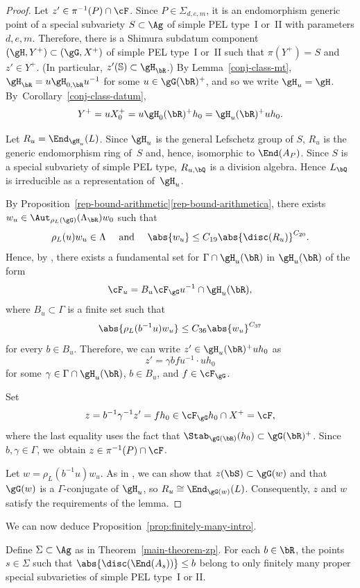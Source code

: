 \begin{proof}
Let $z'\in \pi^{-1}(P)\cap\cF$.
Since $P\in\Sigma_{d,e,m}$, it is an endomorphism generic point of a special subvariety $S \subset \Ag$ of simple PEL type~I or~II with parameters $d,e,m$.
Therefore, there is a Shimura subdatum component $(\gH, Y^+) \subset (\gG, X^+)$ of simple PEL type~I or~II such that $\pi(Y^+) = S$ and $z' \in Y^+$. (In particular, $z'(\mathbb{S})\subset\gH_{\bR}$.) By Lemma~\ref{conj-class-mt}, $\gH_{\bR} = u\gH_{0,\bR}u^{-1}$ for some $u\in\gG(\bR)^+$, and so we write $\gH_u=\gH$.
By~Corol\-lary~\ref{conj-class-datum},
\[Y^+=uX^+_0=u\gH_0(\bR)^+h_0=\gH_u(\bR)^+uh_0.
\]

Let $R_u = \End_{\gH_u}(L)$.
Since $\gH_u$ is the general Lefschetz group of $S$, $R_u$ is the generic endomorphism ring of~$S$ and, hence, isomorphic to $\End(A_P)$. Since $S$ is a special subvariety of simple PEL type, $R_{u,\bQ}$ is a division algebra.
Hence $L_\bQ$ is irreducible as a representation of~$\gH_u$.

By Proposition~\ref{rep-bound-arithmetic}\eqref{rep-bound-arithmetica}, there exists $w_u \in \Aut_{\rho_L(\gG)}(\Lambda_\bR) w_0$ such that
\[
\rho_L(u) w_u \in \Lambda \quad \text{ and } \quad \abs{w_u} \leq C_{19} \abs{\disc(R_u)}^{C_{20}}.
\]
Hence, by \cite[Th.\,1.2]{QRTUI}, there exists a fundamental set for $\Gamma\cap\gH_u(\bR)$ in $\gH_u(\bR)$ of the form
\[
\cF_u=B_u\cF_\gG u^{-1}\cap\gH_u(\bR),\]
where $B_u\subset\Gamma$ is a finite set such that
\[\abs{\rho_L(b^{-1}u)w_u} \leq C_{36} \abs{w_u}^{C_{37}}\]
for every $b\in B_u$.
Therefore, we can write $z' \in \gH_u(\bR)^+ uh_0$ as
\[
z' = \gamma b f u^{-1}\cdot uh_0
\]
for some $\gamma \in \Gamma \cap \gH_u(\bR)$, $b \in B_u$, and $f \in \cF_\gG$.

Set
\[
z = b^{-1}\gamma^{-1}z' = fh_0 \in \cF_\gG h_0\cap X^+=\cF,
\]
where the last equality uses the fact that $\Stab_{\gG(\bR)}(h_0)\subset\gG(\bR)^+$.
Since $b, \gamma \in \Gamma$, we~obtain $z \in \pi^{-1}(P) \cap \cF$.

Let $w=\rho_L(b^{-1}u)w_u$.
As in \cite[Prop.\,6.3]{QRTUI}, we can show that $z(\bS) \subset \gG(w)$ and that $\gG(w)$ is a $\Gamma$-conjugate of $\gH_u$, so $R_u \cong \End_{\gG(w)}(L)$.
Consequently, $z$ and $w$ satisfy the requirements of the lemma.
\end{proof}

We can now deduce Proposition~\ref{prop:finitely-many-intro}.

\begin{corollary}\label{prop:finitely-many}
Define $\Sigma \subset \Ag$ as in Theorem~\ref{main-theorem-zp}.
For each $b\in\bR$, the points $s\in\Sigma$ such that $\abs{\disc(\End(A_s))} \leq b$ belong to only finitely many proper special subvarieties of simple PEL type~I or II.
\end{corollary}

